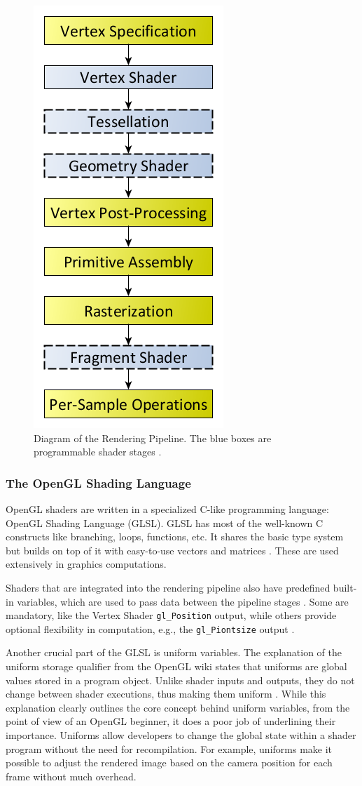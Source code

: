 \documentclass[
  digital,     %
  oneside,     %
  nosansbold,  %
  nocolorbold, %
  lof,         %
  lot,         %
]{fithesis4}
\begin{document}
\begin{figure}[H]
    \centering
    \includegraphics[height=0.75\linewidth]{images/RenderingPipeline.png}
    \caption{Diagram of the Rendering Pipeline. The blue boxes are programmable shader stages
    \cite{openglwiki-rendering-pipeline}.}
    \label{fig:rendering-pipeline}
\end{figure}

\subsubsection{The OpenGL Shading Language}
OpenGL shaders are written in a specialized C-like programming language: OpenGL Shading
Language (GLSL). GLSL has most of the well-known C constructs like branching, loops, functions, etc.
It shares the basic type system but builds on top of it with easy-to-use vectors and matrices \cite{openglwiki-glsl}.
These are used extensively in graphics computations.

Shaders that are integrated into the rendering pipeline also have predefined built-in variables, which
are used to pass data between the pipeline stages \cite{learnopengl-triangle}. Some are mandatory, like the Vertex Shader
\verb|gl_Position| output, while others provide optional flexibility in computation, e.g., the
\verb|gl_Piontsize| output \cite{openglwiki-vertex-shader}.

Another crucial part of the GLSL is uniform variables. The explanation of the uniform storage qualifier
from the OpenGL wiki states that uniforms are global values stored in a program object. Unlike
shader inputs and outputs, they do not change between shader executions, thus making them
uniform \cite{openglwiki-uniform}. While this explanation clearly outlines the core concept behind uniform variables, from
the point of view of an OpenGL beginner, it does a poor job of underlining their importance.
Uniforms allow developers to change the global state within a shader program without the need for
recompilation. For example, uniforms make it possible to adjust the rendered image based on the
camera position for each frame without much overhead.
\end{document}
